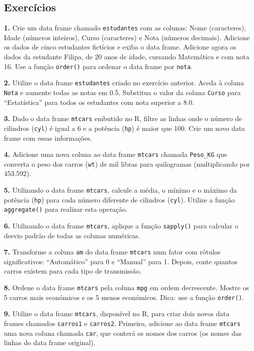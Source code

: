 \documentclass[
]{book}
\begin{document}
\subsection{Exercícios}\label{exercuxedcios-4}

\textbf{1.} Crie um data frame chamado \texttt{estudantes} com as colunas: Nome
(caracteres), Idade (números inteiros), Curso (caracteres) e Nota
(números decimais). Adicione os dados de cinco estudantes fictícios e
exiba o data frame. Adicione agora os dados da estudante Filipa, de 20 anos de idade, cursando Matemática e com nota 16. Use a função \texttt{order()} para ordenar o data frame por \texttt{nota}.

\textbf{2.} Utilize o data frame \texttt{estudantes} criado no exercício anterior.
Aceda à coluna \texttt{Nota} e aumente todas as notas em 0.5. Substitua o valor
da coluna \texttt{Curso} para ``Estatística'' para todos os estudantes com nota
superior a 8.0.

\textbf{3.} Dado o data frame \texttt{mtcars} embutido no R, filtre as linhas onde o
número de cilindros (\texttt{cyl}) é igual a 6 e a potência (\texttt{hp}) é maior que
100. Crie um novo data frame com essas informações.

\textbf{4.} Adicione uma nova coluna ao data frame \texttt{mtcars} chamada \texttt{Peso\_KG}
que converta o peso dos carros (\texttt{wt}) de mil libras para quilogramas
(multiplicando por 453.592).

\textbf{5.} Utilizando o data frame \texttt{mtcars}, calcule a média, o mínimo e o
máximo da potência (\texttt{hp}) para cada número diferente de cilindros
(\texttt{cyl}). Utilize a função \texttt{aggregate()} para realizar esta operação.

\textbf{6.} Utilizando o data frame \texttt{mtcars}, aplique a função \texttt{sapply()}
para calcular o desvio padrão de todas as colunas numéricas.

\textbf{7.} Transforme a coluna \texttt{am} do data frame \texttt{mtcars} num fator com
rótulos significativos: ``Automático'' para 0 e ``Manual'' para 1. Depois,
conte quantos carros existem para cada tipo de transmissão.

\textbf{8.} Ordene o data frame \texttt{mtcars} pela coluna \texttt{mpg} em ordem
decrescente. Mostre os 5 carros mais económicos e os 5 menos económicos. Dica: use a função \texttt{order()}.

\textbf{9.} Utilize o data frame \texttt{mtcars}, disponível no R, para criar dois novos data frames chamados \texttt{carros1} e \texttt{carros2}. Primeiro, adicione ao data frame \texttt{mtcars} uma nova coluna chamada \texttt{car}, que conterá os nomes dos carros (os nomes das linhas do data frame original).
\end{document}

